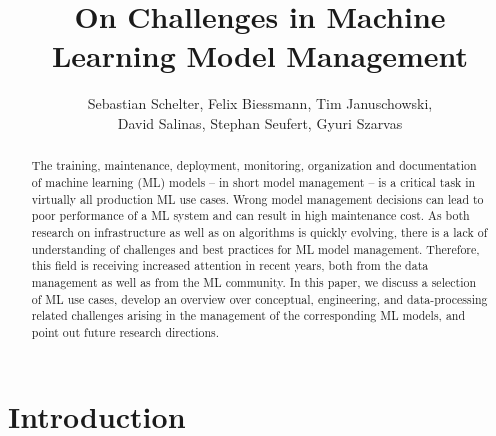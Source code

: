 \documentclass[11pt]{article}
\begin{document}
\title{On Challenges in Machine Learning Model Management}
%
\author{Sebastian Schelter, Felix Biessmann, Tim Januschowski,\\ David Salinas, Stephan Seufert, Gyuri Szarvas}

\maketitle

\begin{abstract}
The training, maintenance, deployment, monitoring, organization and documentation of machine learning (ML) models -- in short model management --
is a critical task in virtually all production ML use cases. Wrong model management decisions can lead to poor performance of a ML system and can result in high maintenance cost. As both research on infrastructure as well as on algorithms is quickly evolving, there is a lack of understanding of challenges and best practices for ML model management. Therefore, this field is receiving increased attention in recent years, both from the data management as well as from the ML community. In this paper, we discuss a selection of ML use cases, develop an overview over conceptual, engineering, and data-processing related challenges arising in the management of the corresponding ML models, and point out future research directions.
\end{abstract}

\section{Introduction}
\end{document}
